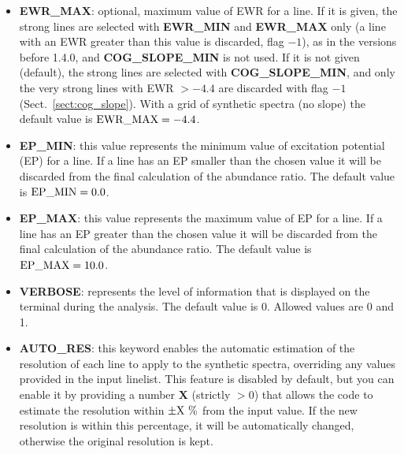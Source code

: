 \documentclass[modern]{aastex701}
\begin{document}
\begin{itemize}
    \item {\bf EWR\_MAX}: optional, maximum value of EWR for a line. If it is given, the strong lines are selected with {\bf EWR\_MIN} and {\bf EWR\_MAX} only (a line with an EWR greater than this value is discarded, flag $-1$), as in the versions before 1.4.0, and {\bf COG\_SLOPE\_MIN} is not used. If it is not given (default), the strong lines are selected with {\bf COG\_SLOPE\_MIN}, and only the very strong lines with EWR $> -4.4$ are discarded with flag $-1$ (Sect.~\ref{sect:cog_slope}). With a grid of synthetic spectra (no slope) the default value is $\rm EWR\_MAX = -4.4$.
    \item {\bf EP\_MIN}: this value represents the minimum value of excitation potential (EP) for a line. If a line has an EP smaller than the chosen value it will be discarded from the final calculation of the abundance ratio. The default value is $\rm EP\_MIN = 0.0$.
    \item {\bf EP\_MAX}: this value represents the maximum value of EP for a line. If a line has an EP greater than the chosen value it will be discarded from the final calculation of the abundance ratio. The default value is $\rm EP\_MAX = 10.0$.
    \item {\bf VERBOSE}: represents the level of information that is displayed on the terminal during the analysis. The default value is 0. Allowed values are 0 and 1.
    \item {\bf AUTO\_RES}: this keyword enables the automatic estimation of the resolution of each line to apply to the synthetic spectra, overriding any values provided in the input linelist. This feature is disabled by default, but you can enable it by providing a number {\bf X} (strictly $> 0$) that allows the code to estimate the resolution within {\bf $\rm\pm X~\%$} from the input value. If the new resolution is within this percentage, it will be automatically changed, otherwise the original resolution is kept.

\end{itemize}
\end{document}
